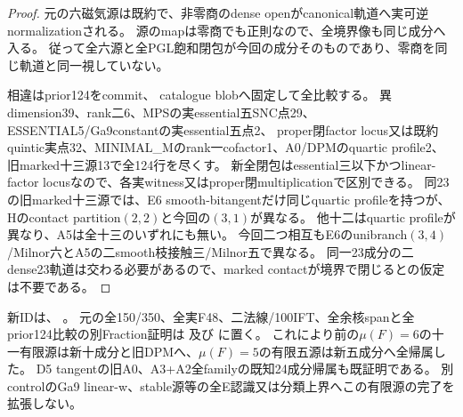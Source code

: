 \documentclass[a4paper,11pt]{ltjsarticle}
\theoremstyle{definition}
\begin{document}
\begin{proof}
元の六磁気源は既約で、非零商のdense openがcanonical軌道へ実可逆normalizationされる。
源のmapは零商でも正則なので、全境界像も同じ成分へ入る。
従って全六源と全PGL飽和閉包が今回の成分そのものであり、零商を同じ軌道と同一視していない。

相違はprior124をcommit、
catalogue blobへ固定して全比較する。
異dimension39、rank二6、MPSの実essential五SNC点29、ESSENTIAL5/Ga9constantの実essential五点2、
proper閉factor locus又は既約quintic実点32、MINIMAL\_Mのrank一cofactor1、A0/DPMのquartic profile2、
旧marked十三源13で全124行を尽くす。
新全閉包はessential三以下かつlinear-factor locusなので、各実witness又はproper閉multiplicationで区別できる。
同23の旧marked十三源では、E6 smooth-bitangentだけ同じquartic profileを持つが、
Hのcontact partition$(2,2)$と今回の$(3,1)$が異なる。
他十二はquartic profileが異なり、A5は全十三のいずれにも無い。
今回二つ相互もE6のunibranch$(3,4)$/Milnor六とA5の二smooth枝接触三/Milnor五で異なる。
同一23成分の二dense23軌道は交わる必要があるので、marked contactが境界で閉じるとの仮定は不要である。
\end{proof}
新IDは、
。
元の全150/350、全実F48、二法線/100IFT、全余核spanと全prior124比較の別Fraction証明は
及び
に置く。
これにより前の$\mu(F)=6$の十一有限源は新十成分と旧DPMへ、$\mu(F)=5$の有限五源は新五成分へ全帰属した。
D5 tangentの旧A0、A3+A2全familyの既知24成分帰属も既証明である。
別controlのGa9 linear-w、stable源等の全E認識又は分類上界へこの有限源の完了を拡張しない。
\end{document}
